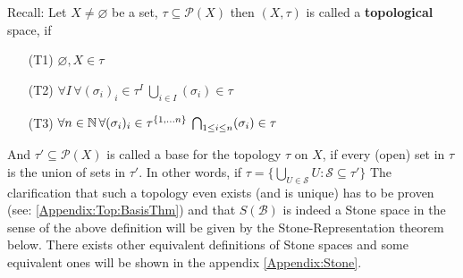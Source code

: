 Recall: Let $X\neq \varnothing$ be a set, $\tau \subseteq \mathcal{P}(X)$ then $(X,\tau)$ is called a \textbf{topological} space, if 
    \begin{enumerate}[leftmargin=1.5cm]
        \item[(T1)] $\varnothing, X\in \tau$
        \item[(T2)] $\forall I \,\forall (\sigma_i)_i\in \tau^I\: \bigcup_{i\in I}(\sigma_i)\in \tau$
        \item[(T3)] $\forall n\in \mathbb{N} \,\forall (\sigma_i)_i\in \tau^{\{1,\dots n\}}\: \bigcap_{1\leq i\leq n}(\sigma_i)\in \tau$
    \end{enumerate}
    And $\tau'\subseteq \mathcal{P}(X)$ is called a base for the topology $\tau$ on $X$,
    if every (open) set in $\tau$ is the union of sets in $\tau'$. 
    In other words, if $\tau = \{\bigcup_{U\in \mathcal{S}} U : \mathcal{S}\subseteq \tau'\}$
The clarification that such a topology even exists (and is unique) has to be proven (see: \ref{Appendix:Top:BasisThm}) and that $S(\mathcal{B})$ is indeed a Stone space in the sense of the above definition will be given by the Stone-Representation theorem below.
There exists other equivalent definitions of Stone spaces and some equivalent ones will be shown in the appendix \ref{Appendix:Stone}.

